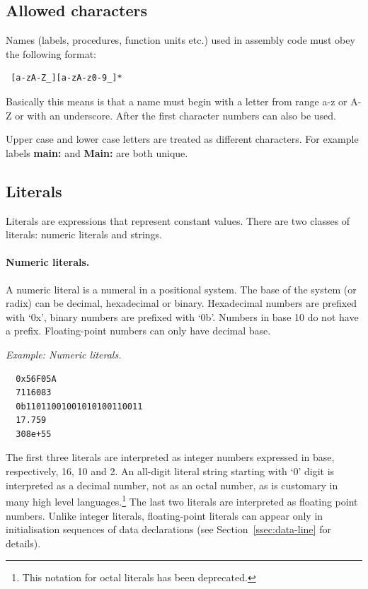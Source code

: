 \documentclass[twoside]{tceusermanual}
\begin{document}
\subsection{Allowed characters}
\label{sec:names}

Names (labels, procedures, function units etc.) used in assembly code must
obey the following format:

\begin{verbatim}
 [a-zA-Z_][a-zA-z0-9_]*
\end{verbatim}

Basically this means is that a name must begin with a letter from range
a-z or A-Z or with an underscore. After the first character numbers can also
be used.

Upper case and lower case letters are treated as different characters.
For example labels \textbf{main:} and \textbf{Main:} are both unique.

\subsection{Literals}
\label{ssec:literals}

Literals are expressions that represent constant values. There are two
classes of literals: numeric literals and strings.

\paragraph{Numeric literals.}

A numeric literal is a numeral in a positional system. The base of the
system (or radix) can be decimal, hexadecimal or binary. Hexadecimal numbers
are prefixed with `0x', binary numbers are prefixed with `0b'. Numbers in
base 10 do not have a prefix. Floating-point numbers can only have decimal
base.

\emph{Example: Numeric literals.}
%
\begin{verbatim}
  0x56F05A
  7116083
  0b11011001001010100110011
  17.759
  308e+55
\end{verbatim}
The first three literals are interpreted as integer numbers expressed in
base, respectively, 16, 10 and 2. An all-digit literal string starting with
`0' digit is interpreted as a decimal number, not as an octal number, as is
customary in many high level languages.\footnote{
%
  This notation for octal literals has been deprecated.}
%
The last two literals are interpreted as floating point numbers. Unlike
integer literals, floating-point literals can appear only in initialisation
sequences of data declarations (see Section~\ref{ssec:data-line} for
details).
\end{document}
